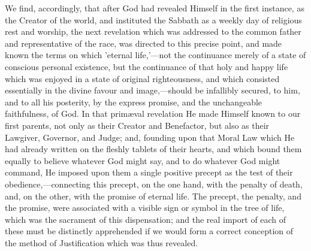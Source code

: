\documentclass[
]{book}
\begin{document}
We find, accordingly, that after God had revealed Himself in the first instance, as the Creator of the world, and instituted the Sabbath as a weekly day of religious rest and worship, the next revelation which was addressed to the common father and representative of the race, was directed to this precise point, and made known the terms on which 'eternal life,'---not the continuance merely of a state of conscious personal existence, but the continuance of that holy and happy life which was enjoyed in a state of original righteousness, and which consisted essentially in the divine favour and image,---should be infallibly secured, to him, and to all his posterity, by the express promise, and the unchangeable faithfulness, of God. In that primæval revelation He made Himself known to our first parents, not only as their Creator and Benefactor, but also as their Lawgiver, Governor, and Judge; and, founding upon that Moral Law which He had already written on the fleshly tablets of their hearts, and which bound them equally to believe whatever God might say, and to do whatever God might command, He imposed upon them a single positive precept as the test of their obedience,---connecting this precept, on the one hand, with the penalty of death, and, on the other, with the promise of eternal life. The precept, the penalty, and the promise, were associated with a visible sign or symbol in the tree of life, which was the sacrament of this dispensation; and the real import of each of these must be distinctly apprehended if we would form a correct conception of the method of Justification which was thus revealed.
\end{document}
